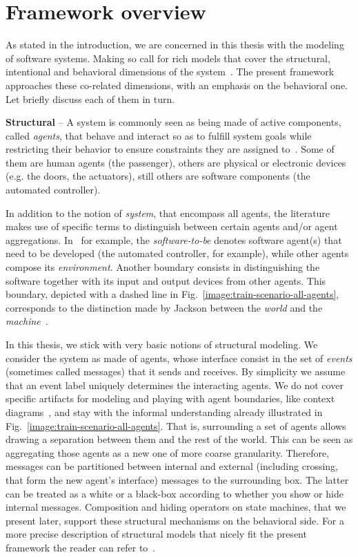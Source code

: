 \section{Framework overview\label{section:background-multi-agent-systems-and-behavior-modeling}}

As stated in the introduction, we are concerned in this thesis with the modeling of software systems. Making so call for rich models that cover the structural, intentional and behavioral dimensions of the system~\cite{VanLamsweerde:2000}. The present framework approaches these co-related dimensions, with an emphasis on the behavioral one. Let briefly discuss each of them in turn.

\noindent \textbf{Structural} -- A system is commonly seen as being made of active components, called \emph{agents}, that behave and interact so as to fulfill system goals while restricting their behavior to ensure constraints they are assigned to~\cite{Feather:1987}. Some of them are human agents (the passenger), others are physical or electronic devices (e.g. the doors, the actuators), still others are software components (the automated controller).

In addition to the notion of \emph{system}, that encompass all agents, the literature makes use of specific terms to distinguish between certain agents and/or agent aggregations. In~\cite{VanLamsweerde:2009} for example, the \emph{software-to-be} denotes software agent(s) that need to be developed (the automated controller, for example), while other agents compose its \emph{environment}. Another boundary consists in distinguishing the software together with its input and output devices from other agents. This boundary, depicted with a dashed line in Fig.~\ref{image:train-scenario-all-agents}, corresponds to the distinction made by Jackson between the \emph{world} and the \emph{machine}~\cite{Jackson:1995}.

In this thesis, we stick with very basic notions of structural modeling. We consider the system as made of agents, whose interface consist in the set of \emph{events} (sometimes called messages) that it sends and receives. By simplicity we assume that an event label uniquely determines the interacting agents. We do not cover specific artifacts for modeling and playing with agent boundaries, like context diagrams~\cite{Feather:1987}, and stay with the informal understanding already illustrated in Fig.~\ref{image:train-scenario-all-agents}. That is, surrounding a set of agents allows drawing a separation between them and the rest of the world. This can be seen as aggregating those agents as a new one of more coarse granularity. Therefore, messages can be partitioned between internal and external (including crossing, that form the new agent's interface) messages to the surrounding box. The latter can be treated as a white or a black-box according to whether you show or hide internal messages. Composition and hiding operators on state machines, that we present later, support these structural mechanisms on the behavioral side. For a more precise description of structural models that nicely fit the present framework the reader can refer to~\cite{Magee:1995}.

